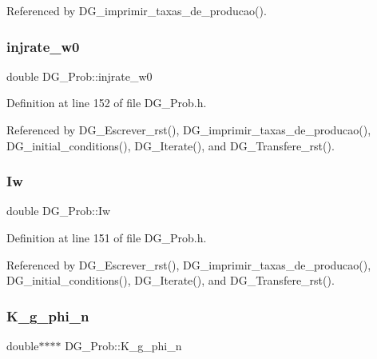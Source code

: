 Referenced by D\+G\+\_\+imprimir\+\_\+taxas\+\_\+de\+\_\+producao().

\mbox{\label{classDG__Prob_a8fc3d2c5122a16140acf1b769f11b471}} 
\subsubsection{\texorpdfstring{injrate\+\_\+w0}{injrate\_w0}}
{\footnotesize\ttfamily double D\+G\+\_\+\+Prob\+::injrate\+\_\+w0\hspace{0.3cm}{\ttfamily [private]}}



Definition at line 152 of file D\+G\+\_\+\+Prob.\+h.



Referenced by D\+G\+\_\+\+Escrever\+\_\+rst(), D\+G\+\_\+imprimir\+\_\+taxas\+\_\+de\+\_\+producao(), D\+G\+\_\+initial\+\_\+conditions(), D\+G\+\_\+\+Iterate(), and D\+G\+\_\+\+Transfere\+\_\+rst().

\mbox{\label{classDG__Prob_a35c69d2d0422f896101f61240efca64a}} 
\subsubsection{\texorpdfstring{Iw}{Iw}}
{\footnotesize\ttfamily double D\+G\+\_\+\+Prob\+::\+Iw\hspace{0.3cm}{\ttfamily [private]}}



Definition at line 151 of file D\+G\+\_\+\+Prob.\+h.



Referenced by D\+G\+\_\+\+Escrever\+\_\+rst(), D\+G\+\_\+imprimir\+\_\+taxas\+\_\+de\+\_\+producao(), D\+G\+\_\+initial\+\_\+conditions(), D\+G\+\_\+\+Iterate(), and D\+G\+\_\+\+Transfere\+\_\+rst().

\mbox{\label{classDG__Prob_acff73e57edccd78892771da628f85775}} 
\subsubsection{\texorpdfstring{K\+\_\+g\+\_\+phi\+\_\+n}{K\_g\_phi\_n}}
{\footnotesize\ttfamily double$\ast$$\ast$$\ast$$\ast$ D\+G\+\_\+\+Prob\+::\+K\+\_\+g\+\_\+phi\+\_\+n\hspace{0.3cm}{\ttfamily [private]}}



